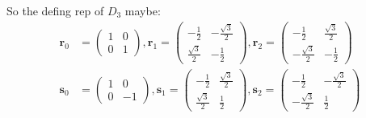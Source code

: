 \documentclass[]{ctexart}
\begin{document}
    So the defing rep of $ D_3 $ maybe:
    \begin{equation*}
    	\begin{aligned}
    	\mathbf{r}_{0} &=\left(\begin{array}{cc}
    	1 & 0 \\
    	0 & 1
    	\end{array}\right), \mathbf{r}_{1} =\left(\begin{array}{cc}
    	-\frac{1}{2} & -\frac{\sqrt{3}}{2} \\
    	\frac{\sqrt{3}}{2} & -\frac{1}{2}
    	\end{array}\right), \mathbf{r}_{2} =\left(\begin{array}{cc}
    	-\frac{1}{2} & \frac{\sqrt{3}}{2} \\
    	-\frac{\sqrt{3}}{2} & -\frac{1}{2}
    	\end{array}\right)\\
    	\mathbf{s}_{0} &=\left(\begin{array}{cc}
    	1 & 0 \\
    	0 & -1
    	\end{array}\right), \mathbf{s}_{1}=\left(\begin{array}{cc}
    	-\frac{1}{2} & \frac{\sqrt{3}}{2} \\
    	\frac{\sqrt{3}}{2} & \frac{1}{2}
    	\end{array}\right), \mathbf{s}_{2}=\left(\begin{array}{cc}
    	-\frac{1}{2} & -\frac{\sqrt{3}}{2} \\
    	-\frac{\sqrt{3}}{2} & \frac{1}{2}
    	\end{array}\right)
    	\end{aligned}
    \end{equation*}
    
\end{document}
